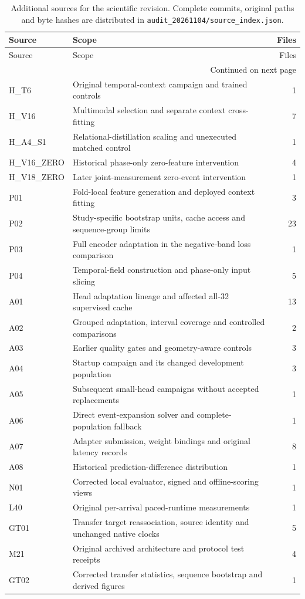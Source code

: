 \begin{longtable}{@{}p{.16\linewidth}p{.70\linewidth}r@{}}
\caption{Additional sources for the scientific revision. Complete commits, original paths and byte hashes are distributed in \texttt{audit\_20261104/source\_index.json}.}\label{tab:audit-sources}\\
\toprule Source & Scope & Files \\\midrule\endfirsthead
\toprule Source & Scope & Files \\\midrule\endhead
\midrule\multicolumn{3}{r}{\scriptsize Continued on next page}\\\endfoot
\bottomrule\endlastfoot
H\_T6 & Original temporal-context campaign and trained controls & 1 \\
H\_V16 & Multimodal selection and separate context cross-fitting & 7 \\
H\_A4\_S1 & Relational-distillation scaling and unexecuted matched control & 1 \\
H\_V16\_ZERO & Historical phase-only zero-feature intervention & 4 \\
H\_V18\_ZERO & Later joint-measurement zero-event intervention & 1 \\
P01 & Fold-local feature generation and deployed context fitting & 3 \\
P02 & Study-specific bootstrap units, cache access and sequence-group limits & 23 \\
P03 & Full encoder adaptation in the negative-band loss comparison & 1 \\
P04 & Temporal-field construction and phase-only input slicing & 5 \\
A01 & Head adaptation lineage and affected all-32 supervised cache & 13 \\
A02 & Grouped adaptation, interval coverage and controlled comparisons & 2 \\
A03 & Earlier quality gates and geometry-aware controls & 3 \\
A04 & Startup campaign and its changed development population & 3 \\
A05 & Subsequent small-head campaigns without accepted replacements & 1 \\
A06 & Direct event-expansion solver and complete-population fallback & 1 \\
A07 & Adapter submission, weight bindings and original latency records & 8 \\
A08 & Historical prediction-difference distribution & 1 \\
N01 & Corrected local evaluator, signed and offline-scoring views & 1 \\
L40 & Original per-arrival paced-runtime measurements & 1 \\
GT01 & Transfer target reassociation, source identity and unchanged native clocks & 5 \\
M21 & Original archived architecture and protocol test receipts & 4 \\
GT02 & Corrected transfer statistics, sequence bootstrap and derived figures & 1 \\
\end{longtable}
